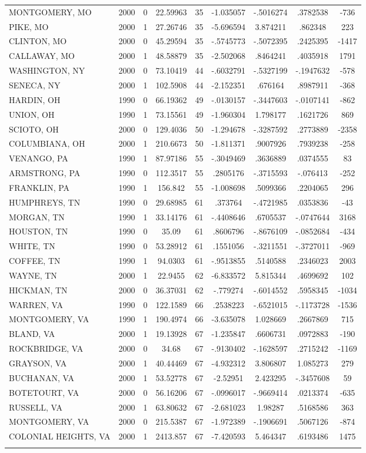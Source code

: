 \documentclass{article}
\begin{document}
\begin{table}[tbp]
\begin{tabularx}{\textwidth}{lCCCCCCCC}
MONTGOMERY, MO&2000&0&22.59963&35&-1.035057&-.5016274&.3782538&-736 \tabularnewline
PIKE, MO&2000&1&27.26746&35&-5.696594&3.874211&.862348&223 \tabularnewline
CLINTON, MO&2000&0&45.29594&35&-.5745773&-.5072395&.2425395&-1417 \tabularnewline
CALLAWAY, MO&2000&1&48.58879&35&-2.502068&.8464241&.4035918&1791 \tabularnewline
WASHINGTON, NY&2000&0&73.10419&44&-.6032791&-.5327199&-.1947632&-578 \tabularnewline
SENECA, NY&2000&1&102.5908&44&-2.152351&.676164&.8987911&-368 \tabularnewline
HARDIN, OH&1990&0&66.19362&49&-.0130157&-.3447603&-.0107141&-862 \tabularnewline
UNION, OH&1990&1&73.15561&49&-1.960304&1.798177&.1621726&869 \tabularnewline
SCIOTO, OH&2000&0&129.4036&50&-1.294678&-.3287592&.2773889&-2358 \tabularnewline
COLUMBIANA, OH&2000&1&210.6673&50&-1.811371&.9007926&.7939238&-258 \tabularnewline
VENANGO, PA&1990&1&87.97186&55&-.3049469&.3636889&.0374555&83 \tabularnewline
ARMSTRONG, PA&1990&0&112.3517&55&.2805176&-.3715593&-.076413&-252 \tabularnewline
FRANKLIN, PA&1990&1&156.842&55&-1.008698&.5099366&.2204065&296 \tabularnewline
HUMPHREYS, TN&1990&0&29.68985&61&.373764&-.4721985&.0353836&-43 \tabularnewline
MORGAN, TN&1990&1&33.14176&61&-.4408646&.6705537&-.0747644&3168 \tabularnewline
HOUSTON, TN&1990&0&35.09&61&.8606796&-.8676109&-.0852684&-434 \tabularnewline
WHITE, TN&1990&0&53.28912&61&.1551056&-.3211551&-.3727011&-969 \tabularnewline
COFFEE, TN&1990&1&94.0303&61&-.9513855&.5140588&.2346023&2003 \tabularnewline
WAYNE, TN&2000&1&22.9455&62&-6.833572&5.815344&.4699692&102 \tabularnewline
HICKMAN, TN&2000&0&36.37031&62&-.779274&-.6014552&.5958345&-1034 \tabularnewline
WARREN, VA&1990&0&122.1589&66&.2538223&-.6521015&-.1173728&-1536 \tabularnewline
MONTGOMERY, VA&1990&1&190.4974&66&-3.635078&1.028669&.2667869&715 \tabularnewline
BLAND, VA&2000&1&19.13928&67&-1.235847&.6606731&.0972883&-190 \tabularnewline
ROCKBRIDGE, VA&2000&0&34.68&67&-.9130402&-.1628597&.2715242&-1169 \tabularnewline
GRAYSON, VA&2000&1&40.44469&67&-4.932312&3.806807&1.085273&279 \tabularnewline
BUCHANAN, VA&2000&1&53.52778&67&-2.52951&2.423295&-.3457608&59 \tabularnewline
BOTETOURT, VA&2000&0&56.16206&67&-.0996017&-.9669414&.0213374&-635 \tabularnewline
RUSSELL, VA&2000&1&63.80632&67&-2.681023&1.98287&.5168586&363 \tabularnewline
MONTGOMERY, VA&2000&0&215.5387&67&-1.972389&-.1906691&.5067126&-874 \tabularnewline
COLONIAL HEIGHTS, VA&2000&1&2413.857&67&-7.420593&5.464347&.6193486&1475 \tabularnewline
\bottomrule \addlinespace[1.5ex]
\end{tabularx}%
\end{table}%
\end{document}
